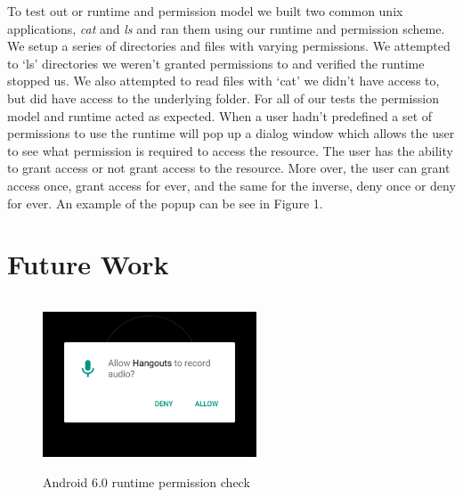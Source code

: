 To test out or runtime and permission model we built two common unix applications, \textit{cat} and \textit{ls} and ran them using our runtime and permission scheme. We setup a series of directories and files with varying permissions. We attempted to `ls' directories we weren't granted permissions to and verified the runtime stopped us. We also attempted to read files with `cat' we didn't have access to, but did have access to the underlying folder. For all of our tests the permission model and runtime acted as expected. When a user hadn't predefined a set of permissions to use the runtime will pop up a dialog window which allows the user to see what permission is required to access the resource. The user has the ability to grant access or not grant access to the resource. More over, the user can grant access once, grant access for ever, and the same for the inverse, deny once or deny for ever. An example of the popup can be see in Figure 1.


\section{Future Work}\label{section:futurework}

\begin{figure}[h]
\centering
\includegraphics[height=2in, width=2.5in]{app.png}
\caption{Android 6.0 runtime permission check}
\end{figure}

